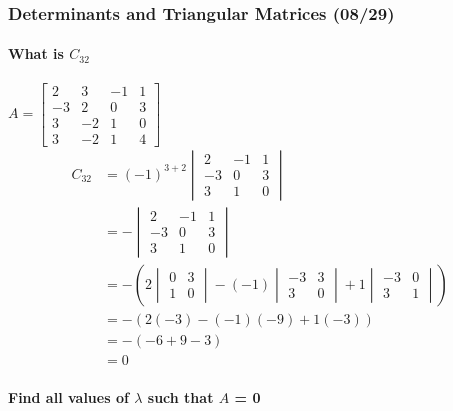 \documentclass[
  letterpaper,
  DIV=11,
  numbers=noendperiod]{scrartcl}
\let\oldparagraph\paragraph
\renewcommand{\paragraph}[1]{\oldparagraph{#1}\mbox{}}
\begin{document}
\newpage{}

\subsubsection{Determinants and Triangular Matrices
(08/29)}\label{determinants-and-triangular-matrices-0829}

\paragraph{\texorpdfstring{What is
\(C_{32}\)}{What is C\_\{32\}}}\label{what-is-c_32}

\(A = \begin{bmatrix}2 & 3 & -1 & 1 \\ -3 & 2 & 0 & 3 \\ 3 & -2 & 1 & 0 \\ 3 & -2 & 1 & 4 \end{bmatrix}\)
\begin{align*}
C_{32} &= (-1)^{3+2}\begin{vmatrix}2 & -1 & 1 \\ -3 & 0 & 3 \\ 3 & 1 & 0\end{vmatrix} \\
&= -\begin{vmatrix}2 & -1 & 1 \\ -3 & 0 & 3 \\ 3 & 1 & 0\end{vmatrix} \\
&= -\left(2\begin{vmatrix}0 & 3 \\ 1 & 0\end{vmatrix}-(-1)\begin{vmatrix}-3 & 3 \\ 3 & 0\end{vmatrix}+1\begin{vmatrix}-3 & 0 \\ 3 & 1\end{vmatrix}\right) \\
&= -\left(2(-3)-(-1)(-9)+1(-3)\right) \\
&= -(-6+9-3) \\
&= 0
\end{align*}

\paragraph{\texorpdfstring{Find all values of \(\lambda\) such that
\textbar{}\(A\)\textbar{} =
0}{Find all values of \textbackslash lambda such that \textbar A\textbar{} = 0}}\label{find-all-values-of-lambda-such-that-a-0}
\end{document}
